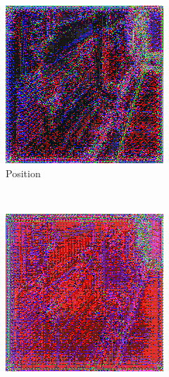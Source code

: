\begin{figure}[h!]
    \centering
    \begin{subfigure}[b]{0.175\textwidth}
     \includegraphics[width=\textwidth]{figures/result/triple/emissive_metalness_position/1.png}
     \caption{Position}\label{subfig:1}
    \end{subfigure}
    ~
    \begin{subfigure}[b]{0.175\textwidth}
     \includegraphics[width=\textwidth]{figures/result/triple/emissive_metalness_roughness/1.png}

\end{subfigure}
\end{figure}
